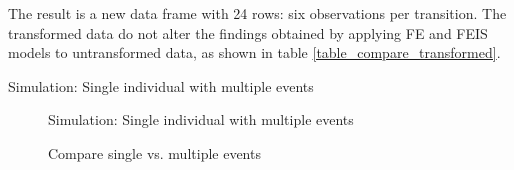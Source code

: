 \documentclass[12pt]{article}
\begin{document}
The result is a new data frame with 24 rows: six observations per transition.  The transformed data do not alter the findings obtained by applying FE and FEIS models to untransformed data, as shown in table \ref{table_compare_transformed}.  

\begin{table}[!h]
    \caption{Simulation: Single individual with multiple events}
    \centering
    \resizebox{\textwidth}{!}{}
    \label{table_compare_transformed}
\end{table}

\begin{figure}
    \caption{Simulation: Single individual with multiple events}
    \label{graph_compare_transformed}
\end{figure}

\begin{figure}
    \caption{Compare single vs. multiple events}
    \label{graph_sensitivity_single_multiple_events}
\end{figure}
\end{document}

